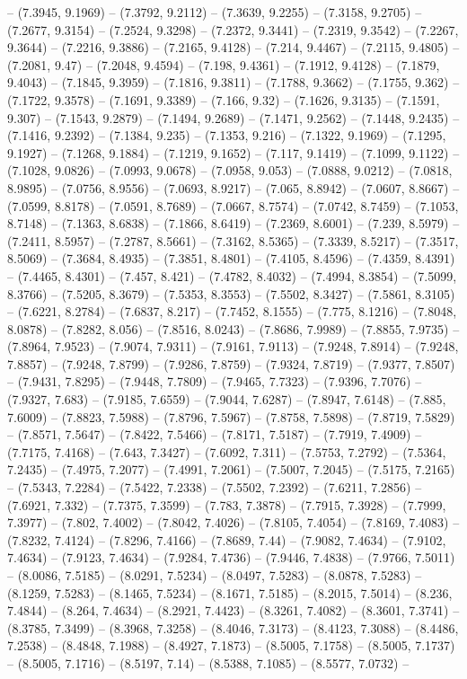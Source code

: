 -- (7.3945, 9.1969) -- (7.3792, 9.2112) -- (7.3639, 9.2255) -- (7.3158, 9.2705) -- (7.2677, 9.3154) -- (7.2524, 9.3298) -- (7.2372, 9.3441) -- (7.2319, 9.3542) -- (7.2267, 9.3644) -- (7.2216, 9.3886) -- (7.2165, 9.4128) -- (7.214, 9.4467) -- (7.2115, 9.4805) -- (7.2081, 9.47) -- (7.2048, 9.4594) -- (7.198, 9.4361) -- (7.1912, 9.4128) -- (7.1879, 9.4043) -- (7.1845, 9.3959) -- (7.1816, 9.3811) -- (7.1788, 9.3662) -- (7.1755, 9.362) -- (7.1722, 9.3578) -- (7.1691, 9.3389) -- (7.166, 9.32) -- (7.1626, 9.3135) -- (7.1591, 9.307) -- (7.1543, 9.2879) -- (7.1494, 9.2689) -- (7.1471, 9.2562) -- (7.1448, 9.2435) -- (7.1416, 9.2392) -- (7.1384, 9.235) -- (7.1353, 9.216) -- (7.1322, 9.1969) -- (7.1295, 9.1927) -- (7.1268, 9.1884) -- (7.1219, 9.1652) -- (7.117, 9.1419) -- (7.1099, 9.1122) -- (7.1028, 9.0826) -- (7.0993, 9.0678) -- (7.0958, 9.053) -- (7.0888, 9.0212) -- (7.0818, 8.9895) -- (7.0756, 8.9556) -- (7.0693, 8.9217) -- (7.065, 8.8942) -- (7.0607, 8.8667) -- (7.0599, 8.8178) -- (7.0591, 8.7689) -- (7.0667, 8.7574) -- (7.0742, 8.7459) -- (7.1053, 8.7148) -- (7.1363, 8.6838) -- (7.1866, 8.6419) -- (7.2369, 8.6001) -- (7.239, 8.5979) -- (7.2411, 8.5957) -- (7.2787, 8.5661) -- (7.3162, 8.5365) -- (7.3339, 8.5217) -- (7.3517, 8.5069) -- (7.3684, 8.4935) -- (7.3851, 8.4801) -- (7.4105, 8.4596) -- (7.4359, 8.4391) -- (7.4465, 8.4301) -- (7.457, 8.421) -- (7.4782, 8.4032) -- (7.4994, 8.3854) -- (7.5099, 8.3766) -- (7.5205, 8.3679) -- (7.5353, 8.3553) -- (7.5502, 8.3427) -- (7.5861, 8.3105) -- (7.6221, 8.2784) -- (7.6837, 8.217) -- (7.7452, 8.1555) -- (7.775, 8.1216) -- (7.8048, 8.0878) -- (7.8282, 8.056) -- (7.8516, 8.0243) -- (7.8686, 7.9989) -- (7.8855, 7.9735) -- (7.8964, 7.9523) -- (7.9074, 7.9311) -- (7.9161, 7.9113) -- (7.9248, 7.8914) -- (7.9248, 7.8857) -- (7.9248, 7.8799) -- (7.9286, 7.8759) -- (7.9324, 7.8719) -- (7.9377, 7.8507) -- (7.9431, 7.8295) -- (7.9448, 7.7809) -- (7.9465, 7.7323) -- (7.9396, 7.7076) -- (7.9327, 7.683) -- (7.9185, 7.6559) -- (7.9044, 7.6287) -- (7.8947, 7.6148) -- (7.885, 7.6009) -- (7.8823, 7.5988) -- (7.8796, 7.5967) -- (7.8758, 7.5898) -- (7.8719, 7.5829) -- (7.8571, 7.5647) -- (7.8422, 7.5466) -- (7.8171, 7.5187) -- (7.7919, 7.4909) -- (7.7175, 7.4168) -- (7.643, 7.3427) -- (7.6092, 7.311) -- (7.5753, 7.2792) -- (7.5364, 7.2435) -- (7.4975, 7.2077) -- (7.4991, 7.2061) -- (7.5007, 7.2045) -- (7.5175, 7.2165) -- (7.5343, 7.2284) -- (7.5422, 7.2338) -- (7.5502, 7.2392) -- (7.6211, 7.2856) -- (7.6921, 7.332) -- (7.7375, 7.3599) -- (7.783, 7.3878) -- (7.7915, 7.3928) -- (7.7999, 7.3977) -- (7.802, 7.4002) -- (7.8042, 7.4026) -- (7.8105, 7.4054) -- (7.8169, 7.4083) -- (7.8232, 7.4124) -- (7.8296, 7.4166) -- (7.8689, 7.44) -- (7.9082, 7.4634) -- (7.9102, 7.4634) -- (7.9123, 7.4634) -- (7.9284, 7.4736) -- (7.9446, 7.4838) -- (7.9766, 7.5011) -- (8.0086, 7.5185) -- (8.0291, 7.5234) -- (8.0497, 7.5283) -- (8.0878, 7.5283) -- (8.1259, 7.5283) -- (8.1465, 7.5234) -- (8.1671, 7.5185) -- (8.2015, 7.5014) -- (8.236, 7.4844) -- (8.264, 7.4634) -- (8.2921, 7.4423) -- (8.3261, 7.4082) -- (8.3601, 7.3741) -- (8.3785, 7.3499) -- (8.3968, 7.3258) -- (8.4046, 7.3173) -- (8.4123, 7.3088) -- (8.4486, 7.2538) -- (8.4848, 7.1988) -- (8.4927, 7.1873) -- (8.5005, 7.1758) -- (8.5005, 7.1737) -- (8.5005, 7.1716) -- (8.5197, 7.14) -- (8.5388, 7.1085) -- (8.5577, 7.0732) -- 